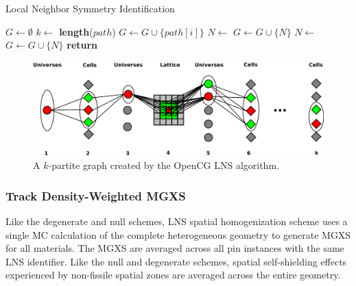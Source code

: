 \begin{algorithm*}[h!]
\caption{Local Neighbor Symmetry Identification}
\label{alg:lns}
\begin{algorithmic}[1]
    \State $G \gets \emptyset$ 
    \State $k \gets$ \textbf{length}($path$) 
            \State $G \gets G \cup \{path[i]\}$ 
            \State $N \gets$  
            \State $G \gets G \cup \{N\}$ 
            \State $N \gets$  
            \State $G \gets G \cup \{N\}$ 
        \EndIf
    \EndFor
    \State \textbf{return}  
\EndProcedure
\end{algorithmic}
\end{algorithm*}

\begin{figure}[h!]
  \centering
  \includegraphics[width=0.8\linewidth]{figures/lns-k-partite-graph}
  \caption{A $k$-partite graph created by the OpenCG LNS algorithm.}
  \label{fig:lns-k-partite-graph}
\end{figure}

\subsubsection{Track Density-Weighted MGXS}
\label{subsubsec:lns-math}

Like the degenerate and null schemes, LNS spatial homogenization scheme uses a single MC calculation of the complete heterogeneous geometry to generate MGXS for all materials. The MGXS are averaged across all pin instances with the same LNS identifier. Like the null and degenerate schemes, spatial self-shielding effects experienced by non-fissile spatial zones are averaged across the entire geometry. 

